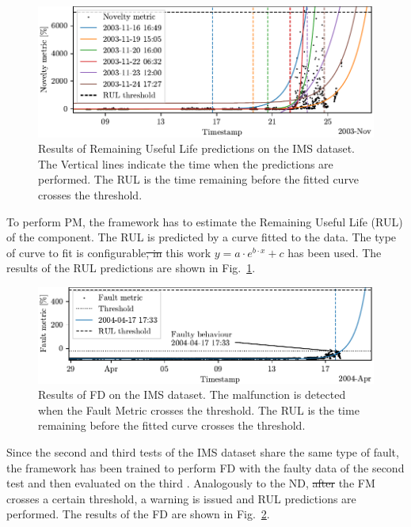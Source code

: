 \documentclass[a4paper, 10pt, conference, oneside]{ieeeconf}
\providecommand{\DIFaddtex}[1]{{\protect\color{blue}\uwave{#1}}} %
\providecommand{\DIFdeltex}[1]{{\protect\color{red}\sout{#1}}}                      %
\providecommand{\DIFaddbegin}{} %
\providecommand{\DIFaddend}{} %
\providecommand{\DIFdelbegin}{} %
\providecommand{\DIFdelend}{} %
\providecommand{\DIFadd}[1]{\texorpdfstring{\DIFaddtex{#1}}{#1}} %
\providecommand{\DIFdel}[1]{\texorpdfstring{\DIFdeltex{#1}}{}} %
\newcommand{\DIFscaledelfig}{0.5}
\newlength{\DIFdelgraphicswidth} %
\newlength{\DIFdelgraphicsheight} %
\newcommand{\DIFaddincludegraphics}[2][]{{\color{blue}\fbox{\DIFOincludegraphics[#1]{#2}}}} %
\newcommand{\DIFdelincludegraphics}[2][]{%
\sbox{\DIFdelgraphicsbox}{\DIFOincludegraphics[#1]{#2}}%
\settoboxwidth{\DIFdelgraphicswidth}{\DIFdelgraphicsbox} %
\settoboxtotalheight{\DIFdelgraphicsheight}{\DIFdelgraphicsbox} %
\scalebox{\DIFscaledelfig}{%
\parbox[b]{\DIFdelgraphicswidth}{\usebox{\DIFdelgraphicsbox}\\[-\baselineskip] \rule{\DIFdelgraphicswidth}{0em}}\llap{\resizebox{\DIFdelgraphicswidth}{\DIFdelgraphicsheight}{%
\setlength{\unitlength}{\DIFdelgraphicswidth}%
\begin{picture}(1,1)%
\thicklines\linethickness{2pt} %
{\color[rgb]{1,0,0}\put(0,0){\framebox(1,1){}}}%
{\color[rgb]{1,0,0}\put(0,0){\line( 1,1){1}}}%
{\color[rgb]{1,0,0}\put(0,1){\line(1,-1){1}}}%
\end{picture}%
}\hspace*{3pt}}} %
} %
\DeclareRobustCommand{\DIFaddbegin}{\DIFOaddbegin \let\includegraphics\DIFaddincludegraphics} %
\DeclareRobustCommand{\DIFaddend}{\DIFOaddend \let\includegraphics\DIFOincludegraphics} %
\DeclareRobustCommand{\DIFdelbegin}{\DIFOdelbegin \let\includegraphics\DIFdelincludegraphics} %
\DeclareRobustCommand{\DIFdelend}{\DIFOaddend \let\includegraphics\DIFOincludegraphics} %
\begin{document}
\begin{figure}
    \includegraphics[width=\linewidth]{images/RUL_IMS.pdf}
    \caption{Results of Remaining Useful Life predictions on the IMS dataset. The Vertical lines indicate the time when the predictions are performed. The RUL is the time remaining before the fitted curve crosses the threshold.}
    \label{fig:RUL_IMS}
\end{figure}
To perform PM, the framework has to estimate the Remaining Useful Life (RUL) of the component. The RUL is predicted by a curve fitted to the data. The type of curve to fit is configurable\DIFdelbegin \DIFdel{, in }\DIFdelend \DIFaddbegin \DIFadd{. In }\DIFaddend this work $y = a \cdot e^{b \cdot x} + c$ has been used. The results of the RUL predictions are shown in Fig.~\ref{fig:RUL_IMS}.

\begin{figure}
    \includegraphics[width=\linewidth]{images/FD_IMS.pdf}
    \caption{Results of FD on the IMS dataset. The malfunction is detected when the Fault Metric crosses the threshold. The RUL is the time remaining before the fitted curve crosses the threshold.}
    \label{fig:FD_IMS}
\end{figure}
Since the second and third tests of the IMS dataset share the same type of fault, the framework has been trained to perform FD with the faulty data of the second test and then \DIFaddbegin \DIFadd{it has been }\DIFaddend evaluated on the third \DIFaddbegin \DIFadd{test}\DIFaddend . Analogously to the ND, \DIFdelbegin \DIFdel{after }\DIFdelend \DIFaddbegin \DIFadd{when }\DIFaddend the FM crosses a certain threshold, a warning is issued and RUL predictions are performed. The results of the FD are shown in Fig.~\ref{fig:FD_IMS}.
\end{document}
